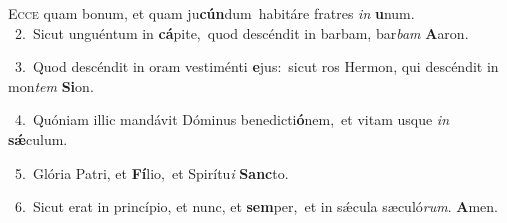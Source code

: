 \lettrine{\initial\textcolor{\initialcolor}{E}}{cce} quam bonum, et quam ju\-\textbf{cún}\-dum~\star habitáre fratres \textit{in} \textbf{u}\-num.\\
{\numbfont\textcolor{\numbcolor}{~2.}}~Sicut unguéntum in \textbf{cá}\-pite,~\star quod descéndit in barbam, bar\textit{bam} \textbf{A}\-aron.\par
{\numbfont\textcolor{\numbcolor}{~3.}}~Quod descéndit in oram vestiménti \textbf{e}\-jus:~\star sicut ros Hermon, qui descéndit in mon\textit{tem} \textbf{Si}\-on.\par
{\numbfont\textcolor{\numbcolor}{~4.}}~Quóniam illic mandávit Dóminus benedicti\-\textbf{ó}\-nem,~\star et vitam usque \textit{in} \textbf{sǽ}\-culum.\par
{\numbfont\textcolor{\numbcolor}{~5.}}~Glória Patri, et \textbf{Fí}\-lio,~\star et Spirítu\textit{i} \textbf{Sanc}\-to.\par
{\numbfont\textcolor{\numbcolor}{~6.}}~Sicut erat in princípio, et nunc, et \textbf{sem}\-per,~\star et in sǽcula sæculó\-\textit{rum}\-. \textbf{A}\-men.\par
